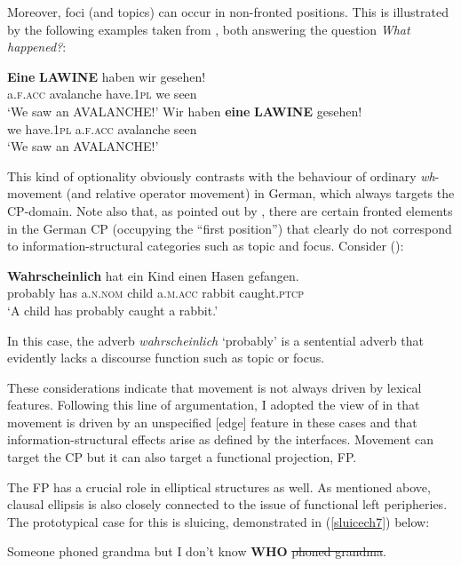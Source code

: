 Moreover, foci (and topics) can occur in non-fronted positions. This is illustrated by the following examples taken from \citet[172, ex. 6c and 6d]{fanselowlenertova2011}, both answering the question \textit{What happened?}:

\ea
\ea \gll \textbf{Eine} \textbf{LAWINE} haben wir gesehen!\\
a.\textsc{f.acc} avalanche have.\textsc{1pl} we seen\\
\glt `We saw an AVALANCHE!'
\ex \gll Wir haben \textbf{eine} \textbf{LAWINE} gesehen!\\
we have.\textsc{1pl} a.\textsc{f.acc} avalanche seen\\
\glt `We saw an AVALANCHE!'
\z
\z

This kind of optionality obviously contrasts with the behaviour of ordinary \textit{wh}-movement (and relative operator movement) in German, which always targets the CP-domain. Note also that, as pointed out by \citet[173]{fanselowlenertova2011}, there are certain fronted elements in the German CP (occupying the ``first position'') that clearly do not correspond to information-structural categories such as topic and focus. Consider (\citealt[173, ex. 7a]{fanselowlenertova2011}):

\ea \gll \textbf{Wahrscheinlich} hat ein Kind einen Hasen gefangen.\\
probably has a.\textsc{n.nom} child a.\textsc{m.acc} rabbit caught.\textsc{ptcp}\\
\glt `A child has probably caught a rabbit.'
\z

In this case, the adverb \textit{wahrscheinlich} `probably' is a sentential adverb that evidently lacks a discourse function such as topic or focus.

These considerations indicate that movement is not always driven by lexical features. Following this line of argumentation, I adopted  the view of \citet{fanselowlenertova2011} in that movement is driven by an unspecified [edge] feature in these cases and that information-structural effects arise as defined by the interfaces. Movement can target the CP but it can also target a functional projection, FP.

The FP has a crucial role in elliptical structures as well. As mentioned above, clausal ellipsis is also closely connected to the issue of functional left peripheries. The prototypical case for this is sluicing, demonstrated in (\ref{sluicech7}) below:

\ea Someone phoned grandma but I don't know \textbf{WHO} \sout{phoned grandma}. \label{sluicech7}
\z

